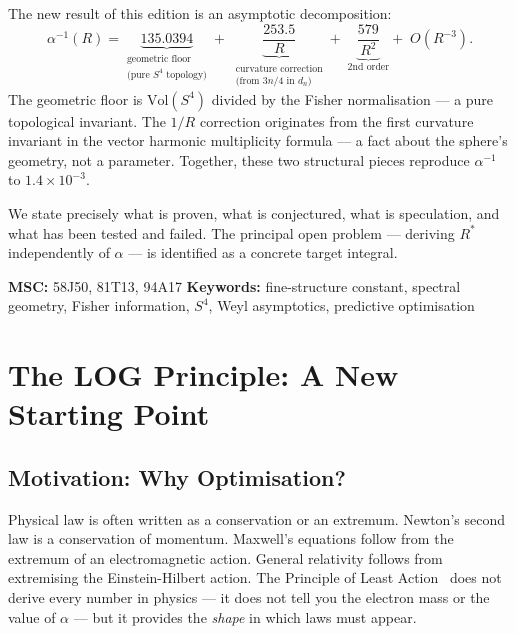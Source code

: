\documentclass[12pt,a4paper]{article}
\newcommand{\ai}{\alpha^{-1}}
\begin{document}
\begin{titlepage}
\begin{keybox}
The new result of this edition is an asymptotic decomposition:
\begin{equation*}
  \ai(R) = \underbrace{135.0394}_{\substack{\text{geometric floor}\\\text{(pure $S^4$ topology)}}}
  +\;
  \underbrace{\frac{253.5}{R}}_{\substack{\text{curvature correction}\\
  \text{(from $3n/4$ in $d_n$)}}}
  +\;
  \underbrace{\frac{579}{R^2}}_{\text{2nd order}}
  +\; O(R^{-3}).
\end{equation*}
The geometric floor is $\mathrm{Vol}(S^4)$ divided by
the Fisher normalisation --- a pure topological invariant.
The $1/R$ correction originates from the first curvature
invariant in the vector harmonic multiplicity formula ---
a fact about the sphere's geometry, not a parameter.
Together, these two structural pieces reproduce
$\alpha^{-1}$ to $1.4 \times 10^{-3}$.

We state precisely what is proven, what is conjectured,
what is speculation, and what has been tested and failed.
The principal open problem --- deriving $R^*$ independently
of $\alpha$ --- is identified as a concrete target integral.

\medskip
\textbf{MSC:} 58J50, 81T13, 94A17
\quad
\textbf{Keywords:} fine-structure constant, spectral geometry,
Fisher information, $S^4$, Weyl asymptotics,
predictive optimisation
\end{keybox}

\vspace{0.5cm}
\tableofcontents
\end{titlepage}
\newpage

\section{The LOG Principle: A New Starting Point}
\label{sec:principle}

\subsection{Motivation: Why Optimisation?}

Physical law is often written as a conservation or
an extremum. Newton's second law is a conservation of momentum.
Maxwell's equations follow from the extremum of an
electromagnetic action. General relativity follows from
extremising the Einstein-Hilbert action.
The Principle of Least Action~\cite{Feynman} does not
derive every number in physics --- it does not tell you
the electron mass or the value of $\alpha$ --- but it
provides the \emph{shape} in which laws must appear.
\end{document}

